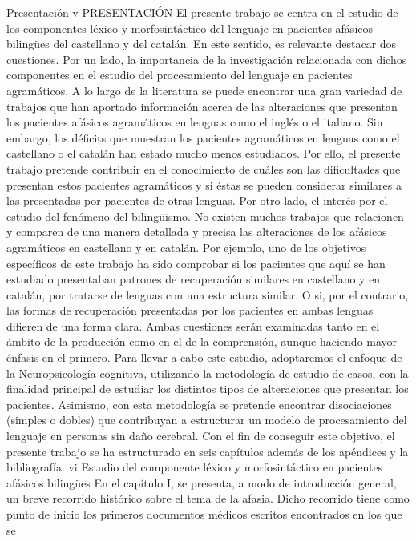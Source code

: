 Presentación v
PRESENTACIÓN
El presente trabajo se centra en el estudio de los componentes léxico y
morfosintáctico del lenguaje en pacientes afásicos bilingües del castellano y del
catalán. En este sentido, es relevante destacar dos cuestiones. Por un lado, la
importancia de la investigación relacionada con dichos componentes en el estudio
del procesamiento del lenguaje en pacientes agramáticos. A lo largo de la
literatura se puede encontrar una gran variedad de trabajos que han aportado
información acerca de las alteraciones que presentan los pacientes afásicos
agramáticos en lenguas como el inglés o el italiano. Sin embargo, los déficits que
muestran los pacientes agramáticos en lenguas como el castellano o el catalán han
estado mucho menos estudiados. Por ello, el presente trabajo pretende contribuir
en el conocimiento de cuáles son las dificultades que presentan estos pacientes
agramáticos y si éstas se pueden considerar similares a las presentadas por
pacientes de otras lenguas.
Por otro lado, el interés por el estudio del fenómeno del bilingüismo. No
existen muchos trabajos que relacionen y comparen de una manera detallada y
precisa las alteraciones de los afásicos agramáticos en castellano y en catalán. Por
ejemplo, uno de los objetivos específicos de este trabajo ha sido comprobar si los
pacientes que aquí se han estudiado presentaban patrones de recuperación
similares en castellano y en catalán, por tratarse de lenguas con una estructura
similar. O si, por el contrario, las formas de recuperación presentadas por los
pacientes en ambas lenguas difieren de una forma clara. Ambas cuestiones serán
examinadas tanto en el ámbito de la producción como en el de la comprensión,
aunque haciendo mayor énfasis en el primero.
Para llevar a cabo este estudio, adoptaremos el enfoque de la
Neuropsicología cognitiva, utilizando la metodología de estudio de casos, con la
finalidad principal de estudiar los distintos tipos de alteraciones que presentan los
pacientes. Asimismo, con esta metodología se pretende encontrar disociaciones
(simples o dobles) que contribuyan a estructurar un modelo de procesamiento del
lenguaje en personas sin daño cerebral.
Con el fin de conseguir este objetivo, el presente trabajo se ha estructurado
en seis capítulos además de los apéndices y la bibliografía.
vi Estudio del componente léxico y morfosintáctico en pacientes afásicos bilingües
En el capítulo I, se presenta, a modo de introducción general, un breve
recorrido histórico sobre el tema de la afasia. Dicho recorrido tiene como punto de
inicio los primeros documentos médicos escritos encontrados en los que se
